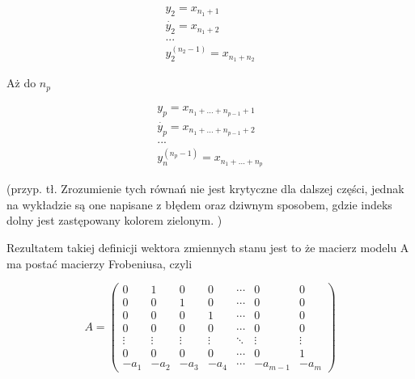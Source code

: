 \documentclass{article}
\begin{document}
		\begin{equation}
			\begin{aligned}

				 y_{2} = x_{n_{1}+1} \\
				 \dot{y_{2}} = x_{n_{1}+2} \\
				... \\
				 y_{2}^{(n_{2}-1)} = x_{n_{1}+n_{2}}

			\end{aligned}
		\end{equation}

		Aż do $ n_{p} $

		\begin{equation}
			\begin{aligned}

				 y_{p} = x_{n_{1}+...+n_{p-1} + 1}  \\
				 \dot{y_{p}} = x_{n_{1}+...+n_{p-1} + 2}  \\
				... \\
				 y_{n}^{(n_{p}-1)} = x_{n_{1}+...+n_{p}}

			\end{aligned}
		\end{equation}


		(przyp. tł. Zrozumienie tych równań nie jest krytyczne dla dalszej części,
		jednak na wykładzie są one napisane z błędem oraz dziwnym sposobem, gdzie
		indeks dolny jest zastępowany kolorem zielonym. )

		Rezultatem takiej definicji wektora zmiennych stanu jest to że macierz modelu A
		ma postać macierzy Frobeniusa, czyli

		\begin{equation}
			A=\begin{pmatrix}
			  0    &   1    &   0    &   0    & \cdots &   0      &   0    \\
			  0    &   0    &   1    &   0    & \cdots &   0      &   0    \\
			  0    &   0    &   0    &   1    & \cdots &   0      &   0    \\
			  0    &   0    &   0    &   0    & \cdots &   0      &   0    \\
			\vdots & \vdots & \vdots & \vdots & \ddots & \vdots   & \vdots \\
			  0    &   0    &   0    &   0    & \cdots &   0      &   1    \\
			 -a_{1}&  -a_{2}&  -a_{3}&  -a_{4}& \cdots & -a_{m-1} & -a_{m}
			\end{pmatrix}
		\end{equation}
\end{document}
